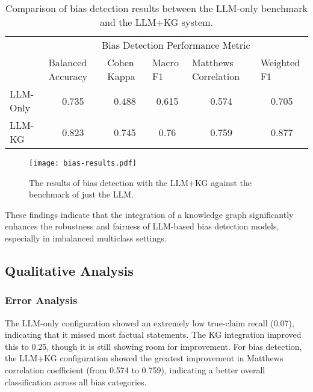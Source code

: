 \documentclass{scrartcl}
\begin{document}
\begin{table}[H]
\begin{tabular}{@{}lccccc@{}}
\toprule
         & \multicolumn{5}{c}{Bias Detection Performance Metric}                                                                                                                                                \\
         & \multicolumn{1}{l}{Balanced   Accuracy} & \multicolumn{1}{l}{Cohen Kappa} & \multicolumn{1}{l}{Macro F1} & \multicolumn{1}{l}{Matthews Correlation} & \multicolumn{1}{l}{Weighted F1} \\ \midrule
LLM-Only & 0.735                                   & 0.488                           & 0.615                        & 0.574                                    & 0.705                           \\
LLM-KG   & 0.823                                   & 0.745                           & 0.76                         & 0.759                                    & 0.877                           \\ \bottomrule
\end{tabular}
\caption{Comparison of bias detection results between the LLM-only benchmark and the LLM+KG system.}
\label{tab:my_table}
\end{table}


\begin{figure}[H]
\begin{center}
\texttt{[image: bias-results.pdf]}
\end{center}
\caption{The results of bias detection with the LLM+KG against the benchmark of just the LLM.}
\label{fig:bias-results}
\end{figure}
These findings indicate that the integration of a knowledge graph significantly enhances the robustness and fairness of LLM-based bias detection models, especially in imbalanced multiclass settings. 


\subsection{Qualitative Analysis}

\subsubsection{Error Analysis}
The LLM-only configuration showed an extremely low true-claim recall (0.07), indicating that it missed most factual statements. The KG integration improved this to 0.25, though it is still showing room for improvement. For bias detection, the LLM+KG configuration showed the greatest improvement in Matthews correlation coefficient (from 0.574 to 0.759), indicating a better overall classification across all bias categories.
\end{document}
